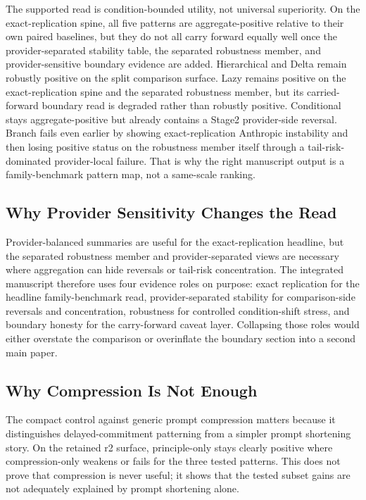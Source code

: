 \documentclass[11pt,a4paper]{article}
\begin{document}
The supported read is condition-bounded utility, not universal superiority. On the exact-replication spine, all five patterns are aggregate-positive relative to their own paired baselines, but they do not all carry forward equally well once the provider-separated stability table, the separated robustness member, and provider-sensitive boundary evidence are added. Hierarchical and Delta remain robustly positive on the split comparison surface. Lazy remains positive on the exact-replication spine and the separated robustness member, but its carried-forward boundary read is degraded rather than robustly positive. Conditional stays aggregate-positive but already contains a Stage2 provider-side reversal. Branch fails even earlier by showing exact-replication Anthropic instability and then losing positive status on the robustness member itself through a tail-risk-dominated provider-local failure. That is why the right manuscript output is a family-benchmark pattern map, not a same-scale ranking.

\subsection{Why Provider Sensitivity Changes the Read}

Provider-balanced summaries are useful for the exact-replication headline, but the separated robustness member and provider-separated views are necessary where aggregation can hide reversals or tail-risk concentration. The integrated manuscript therefore uses four evidence roles on purpose: exact replication for the headline family-benchmark read, provider-separated stability for comparison-side reversals and concentration, robustness for controlled condition-shift stress, and boundary honesty for the carry-forward caveat layer. Collapsing those roles would either overstate the comparison or overinflate the boundary section into a second main paper.

\subsection{Why Compression Is Not Enough}

The compact control against generic prompt compression matters because it distinguishes delayed-commitment patterning from a simpler prompt shortening story. On the retained r2 surface, principle-only stays clearly positive where compression-only weakens or fails for the three tested patterns. This does not prove that compression is never useful; it shows that the tested subset gains are not adequately explained by prompt shortening alone.
\end{document}
